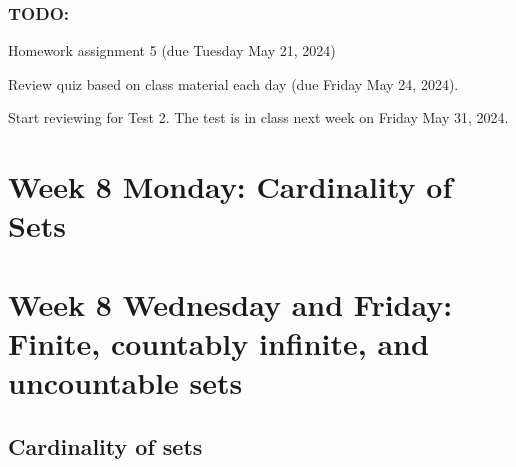 \subsubsection*{TODO:}
\begin{list}
   {\itemsep2pt}
   \item Homework assignment 5 (due Tuesday May 21, 2024)
   \item Review quiz based on class material each day (due Friday May 24, 2024).
   \item Start reviewing for Test 2. The test is in class next week on Friday May 31, 2024.

\end{list}

\newpage

\section*{Week 8 Monday: Cardinality of Sets}

%




\newpage

\newpage




%
\newpage






%

\newpage

\section*{Week 8 Wednesday and Friday: Finite, countably infinite, and uncountable sets}
\subsection*{Cardinality of sets}




\newpage



\newpage
